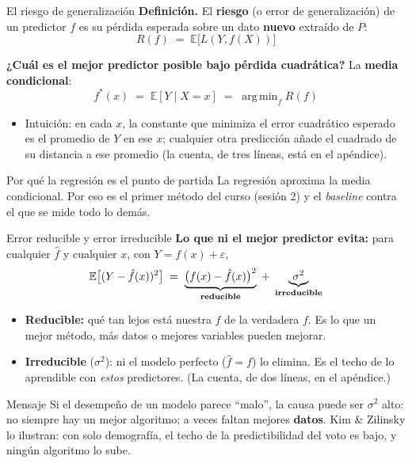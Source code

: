 \documentclass{beamer}
\newcommand{\E}{\mathbb{E}}
\newcommand{\1}{\mathbb{I}}
\DeclareMathOperator*{\argmin}{arg\,min}
\begin{document}
\begin{frame}{El riesgo de generalización}
\small
\textbf{Definición.} El \textbf{riesgo} (o error de generalización) de un predictor $f$ es su pérdida esperada sobre un dato \textbf{nuevo} extraído de $P$:
\[ R(f) \;=\; \E\big[ L(Y, f(X)) \big] \]
\pause

\vspace{0.1cm}
\textbf{¿Cuál es el mejor predictor posible bajo pérdida cuadrática?} La \textbf{media condicional}:
\[ f^\ast(x) \;=\; \E[Y \mid X = x] \;=\; \argmin_{f} R(f) \]
\begin{itemize}\itemsep3pt
  \item Intuición: en cada $x$, la constante que minimiza el error cuadrático esperado es el promedio de $Y$ en ese $x$; cualquier otra predicción añade el cuadrado de su distancia a ese promedio (la cuenta, de tres líneas, está en el apéndice).
\end{itemize}
\pause
\vspace{0.2cm}
\begin{block}{Por qué la regresión es el punto de partida}
La regresión aproxima la media condicional. Por eso es el primer método del curso (sesión 2) y el \emph{baseline} contra el que se mide todo lo demás.
\end{block}
\end{frame}

\begin{frame}{Error reducible y error irreducible}
\small
\textbf{Lo que ni el mejor predictor evita:} para cualquier $\hat{f}$ y cualquier $x$, con $Y = f(x) + \varepsilon$,
\[ \E\big[(Y - \hat{f}(x))^2\big] \;=\; \underbrace{\big(f(x) - \hat{f}(x)\big)^2}_{\text{\textbf{reducible}}} \;+\; \underbrace{\sigma^2}_{\text{\textbf{irreducible}}} \]
\pause
\begin{itemize}\itemsep5pt
  \item \textbf{Reducible:} qué tan lejos está nuestra $\hat{f}$ de la verdadera $f$. Es lo que un mejor método, más datos o mejores variables pueden mejorar.
  \item \textbf{Irreducible} ($\sigma^2$): ni el modelo perfecto ($\hat{f} = f$) lo elimina. Es el techo de lo aprendible con \emph{estos} predictores. (La cuenta, de dos líneas, en el apéndice.)
\end{itemize}
\pause
\vspace{0.2cm}
\begin{block}{Mensaje}
Si el desempeño de un modelo parece ``malo'', la causa puede ser $\sigma^2$ alto: no siempre hay un mejor algoritmo; a veces faltan mejores \textbf{datos}. Kim \& Zilinsky lo ilustran: con solo demografía, el techo de la predictibilidad del voto es bajo, y ningún algoritmo lo sube.
\end{block}
\end{frame}
\end{document}
